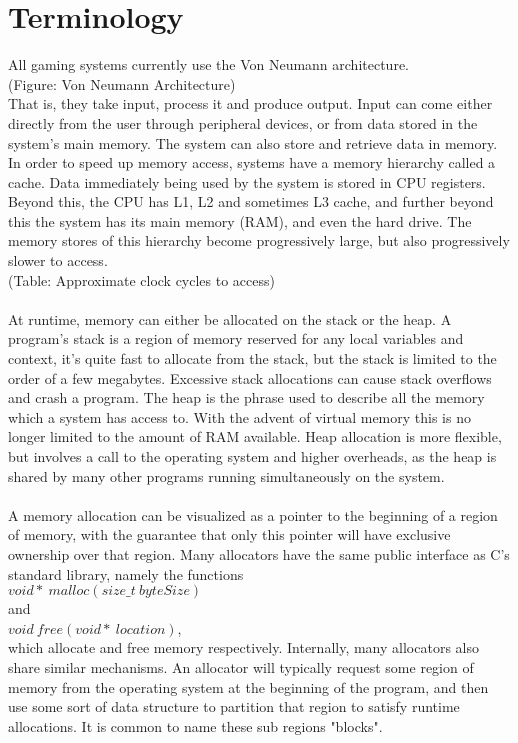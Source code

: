 \documentclass{report}
\begin{document}
\chapter{Terminology}
All gaming systems currently use the Von Neumann architecture.\\
(Figure: Von Neumann Architecture)\\
That is, they take input, process it and produce output. Input can come either directly from the user through peripheral devices, or from data stored in the system's main memory. The system can also store and retrieve data in memory. In order to speed up memory access, systems have a memory hierarchy called a cache. Data immediately being used by the system is stored in CPU registers. Beyond this, the CPU has L1, L2 and sometimes L3 cache, and further beyond this the system has its main memory (RAM), and even the hard drive. The memory stores of this hierarchy become progressively large, but also progressively slower to access.\\
(Table: Approximate clock cycles to access)\\
\\
At runtime, memory can either be allocated on the stack or the heap. A program's stack is a region of memory reserved for any local variables and context, it's quite fast to allocate from the stack, but the stack is limited to the order of a few megabytes. Excessive stack allocations can cause stack overflows and crash a program. The heap is the phrase used to describe all the memory which a system has access to. With the advent of virtual memory this is no longer limited to the amount of RAM available. Heap allocation is more flexible, but involves a call to the operating system and higher overheads, as the heap is shared by many other programs running simultaneously on the system.\\
\\
A memory allocation can be visualized as a pointer to the beginning of a region of memory, with the guarantee that only this pointer will have exclusive ownership over that region. Many allocators have the same public interface as C's standard library, namely the functions \\
$void*\ malloc(size\_t\ byteSize)$ \\
and \\
$void\ free(void*\ location)$, \\
which allocate and free memory respectively. Internally, many allocators also share similar mechanisms. An allocator will typically request some region of memory from the operating system at the beginning of the program, and then use some sort of data structure to partition that region to satisfy runtime allocations. It is common to name these sub regions "blocks".\\
\end{document}
